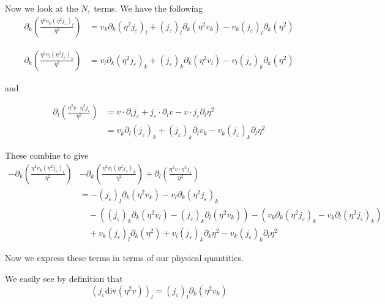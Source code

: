 \documentclass[a4paper]{article}
\renewcommand{\div}{\mathrm{div}}
\begin{document}
Now we look at the $N_\varepsilon$ terms.
We have the following
\begin{align}
  \partial_k \left( \frac{\eta^2 v_k (\eta^2 j_\varepsilon)_l}{\eta^2} \right) &= v_k \partial_k (\eta^2 j_\varepsilon)_l + (j_\varepsilon)_l
  \partial_k (\eta^2 v_k) - v_k (j_\varepsilon)_l \partial_k (\eta^2)
  \label{eqn:quot_rule3}
\end{align}

\begin{align}
  \partial_k \left( \frac{\eta^2 v_l (\eta^2 j_\varepsilon)_k}{\eta^2} \right) &= v_l \partial_k (\eta^2 j_\varepsilon)_k + (j_\varepsilon)_k
  \partial_k (\eta^2 v_l) - v_l (j_\varepsilon)_k \partial_k (\eta^2)
  \label{eqn:quot_rule4}
\end{align}

and

\begin{align}
  \partial_l \left( \frac{\eta^2 v \cdot \eta^2 j_\varepsilon}{\eta^2} \right) &= v \cdot \partial_l j_\varepsilon + j_\varepsilon \cdot \partial_l v
  - v \cdot j_\varepsilon \partial_l \eta^2 \nonumber \\
  &= v_k \partial_l (j_\varepsilon)_k + (j_\varepsilon)_k \partial_l v_k - v_k (j_\varepsilon)_k \partial_l \eta^2
  \label{eqn:quot_rule5}
\end{align}

These combine to give
\begin{align}
  - \partial_k \left( \frac{\eta^2 v_k (\eta^2 j_\varepsilon)_l}{\eta^2} \right) &- \partial_k \left( \frac{\eta^2 v_l (\eta^2
  j_\varepsilon)_k}{\eta^2} \right) + \partial_l \left( \frac{\eta^2 v \cdot \eta^2 j_\varepsilon}{\eta^2} \right) \\
  &= - (j_\varepsilon)_l \partial_k(\eta^2 v_k) - v_l \partial_k(\eta^2 j_\varepsilon)_k \nonumber \\
  &\quad - \left( (j_\varepsilon)_k \partial_k (\eta^2 v_l) - (j_\varepsilon)_k \partial_l (\eta^2 v_k) \right) - \left( v_k \partial_k (\eta^2
  j_\varepsilon)_k - v_k \partial_l (\eta^2 j_\varepsilon)_k \right) \nonumber \\
  &\quad + v_k (j_\varepsilon)_l \partial_k (\eta^2) + v_l (j_\varepsilon)_k \partial_k \eta^2 - v_k (j_\varepsilon)_k \partial_l \eta^2
  \label{eqn:quot_rules2}
\end{align}

Now we express these terms in terms of our physical quantities.

We easily see by definition that
\begin{equation}
  (j_\varepsilon \div (\eta^2 v) )_l = (j_\varepsilon)_l \partial_k (\eta^2 v_k)
  \label{eqn:j_div_eta^2v}
\end{equation}
\end{document}
